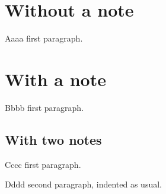 \documentclass[a4paper]{memoir}
\begin{document}
\section{Without a note}
Aaaa first paragraph.

\section{With a note}
Bbbb first paragraph.

\subsection{With two notes}
Cccc first paragraph.

Dddd second paragraph, indented as usual.
\end{document}
